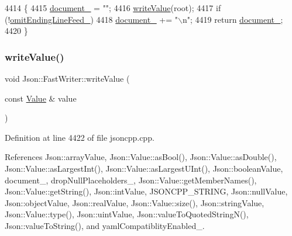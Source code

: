 \begin{DoxyCode}
4414                                                   \{
4415   \hyperlink{class_json_1_1_fast_writer_a5e08c44579db8704dba1ebe37d39fdba}{document\_} = \textcolor{stringliteral}{""};
4416   \hyperlink{class_json_1_1_fast_writer_a2ef4a2ce13a341171f01f414f4fdd765}{writeValue}(root);
4417   \textcolor{keywordflow}{if} (!\hyperlink{class_json_1_1_fast_writer_abd6e13851db6dcf59d84af68d48d50ac}{omitEndingLineFeed\_})
4418     \hyperlink{class_json_1_1_fast_writer_a5e08c44579db8704dba1ebe37d39fdba}{document\_} += \textcolor{stringliteral}{"\(\backslash\)n"};
4419   \textcolor{keywordflow}{return} \hyperlink{class_json_1_1_fast_writer_a5e08c44579db8704dba1ebe37d39fdba}{document\_};
4420 \}
\end{DoxyCode}
\mbox{\label{class_json_1_1_fast_writer_a2ef4a2ce13a341171f01f414f4fdd765}} 
\subsubsection{\texorpdfstring{write\+Value()}{writeValue()}}
{\footnotesize\ttfamily void Json\+::\+Fast\+Writer\+::write\+Value (\begin{DoxyParamCaption}\item[{const \hyperlink{class_json_1_1_value}{Value} \&}]{value }\end{DoxyParamCaption})\hspace{0.3cm}{\ttfamily [private]}}



Definition at line 4422 of file jsoncpp.\+cpp.



References Json\+::array\+Value, Json\+::\+Value\+::as\+Bool(), Json\+::\+Value\+::as\+Double(), Json\+::\+Value\+::as\+Largest\+Int(), Json\+::\+Value\+::as\+Largest\+U\+Int(), Json\+::boolean\+Value, document\+\_\+, drop\+Null\+Placeholders\+\_\+, Json\+::\+Value\+::get\+Member\+Names(), Json\+::\+Value\+::get\+String(), Json\+::int\+Value, J\+S\+O\+N\+C\+P\+P\+\_\+\+S\+T\+R\+I\+NG, Json\+::null\+Value, Json\+::object\+Value, Json\+::real\+Value, Json\+::\+Value\+::size(), Json\+::string\+Value, Json\+::\+Value\+::type(), Json\+::uint\+Value, Json\+::value\+To\+Quoted\+String\+N(), Json\+::value\+To\+String(), and yaml\+Compatiblity\+Enabled\+\_\+.




